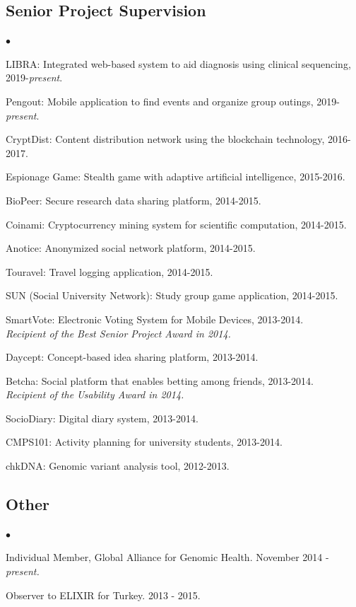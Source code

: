\documentclass[margin,line]{res}
\newenvironment{list2}{
  \begin{list}{$\bullet$}{%
      \setlength{\itemsep}{0.1cm}
      \setlength{\parsep}{0in} \setlength{\parskip}{0in}
      \setlength{\topsep}{0in} \setlength{\partopsep}{0in} 
      \setlength{\leftmargin}{0.2in}}}{\end{list}}
\begin{document}
\begin{resume}
\vspace{-0.4cm}
\subsection{\small \sc Senior Project Supervision}
\begin{list2}
\item LIBRA: Integrated web-based system to aid diagnosis using clinical sequencing, 2019-\textit{present}.
\item Pengout: Mobile application to find events and organize group outings, 2019-\textit{present}.
  \item CryptDist: Content distribution network using the blockchain technology, 2016-2017.
\item Espionage Game: Stealth game with adaptive artificial intelligence, 2015-2016.
  \item BioPeer: Secure research data sharing platform, 2014-2015.
  \item Coinami: Cryptocurrency mining system for scientific computation, 2014-2015.
  \item Anotice: Anonymized social network platform, 2014-2015.
  \item Touravel: Travel logging application, 2014-2015. 
  \item SUN (Social University Network): Study group game application, 2014-2015.
  \item SmartVote: Electronic Voting System for Mobile Devices, 2013-2014. \\
    {\it Recipient of the Best Senior Project Award in 2014.}
  \item Daycept: Concept-based idea sharing platform, 2013-2014.
  \item Betcha: Social platform that enables betting among friends, 2013-2014.\\
    {\it Recipient of the Usability Award in 2014.}
  \item SocioDiary: Digital diary system, 2013-2014.
  \item CMPS101: Activity planning for university students, 2013-2014.
  \item chkDNA: Genomic variant analysis tool, 2012-2013.
\end{list2}


\vspace{-0.4cm}
\subsection{\small \sc Other}
\begin{list2}
\item
  Individual Member, Global Alliance for Genomic Health. November 2014 - {\it present.}
\item
  Observer to ELIXIR for Turkey. 2013 - 2015.
\end{list2}



\end{resume}
\end{document}
